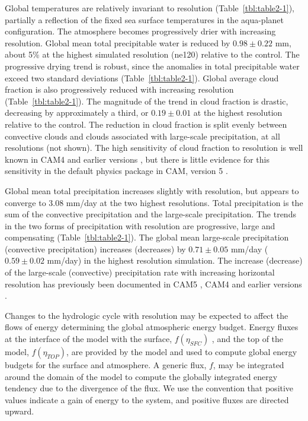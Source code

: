 Global temperatures are relatively invariant to resolution (Table~\ref{tbl:table2-1}), partially a reflection of the fixed sea surface temperatures in the aqua-planet configuration. The atmosphere becomes progressively drier with increasing resolution. Global mean total precipitable water is reduced by $0.98 \pm 0.22$ mm, about 5\% at the highest simulated resolution (ne120) relative to the control. The progressive drying trend is robust, since the anomalies in total precipitable water exceed two standard deviations (Table~\ref{tbl:table2-1}). Global average cloud fraction is also progressively reduced with increasing resolution (Table~\ref{tbl:table2-1}). The magnitude of the trend in cloud fraction is drastic, decreasing by approximately a third, or $0.19 \pm 0.01$ at the highest resolution relative to the control. The reduction in cloud fraction is split evenly between convective clouds and clouds associated with large-scale precipitation, at all resolutions (not shown). The high sensitivity of cloud fraction to resolution is well known in CAM4 \citep{OETAL2013JCLIM,RETAL2013JCLIM,ZetAl2014JCb} and earlier versions \citep{KW1991JGR,W2008TELLUS}, but there is little evidence for this sensitivity in the default physics package in CAM, version 5 \citep[CAM5;][]{ZetAl2014JCb}.

Global mean total precipitation increases slightly with resolution, but appears to converge to 3.08 mm/day at the two highest resolutions. Total precipitation is the sum of the convective precipitation and the large-scale precipitation. The trends in the two forms of precipitation with resolution are progressive, large and compensating (Table~\ref{tbl:table2-1}). The global mean large-scale precipitation (convective precipitation) increases (decreases) by $0.71 \pm 0.05$ mm/day ($0.59 \pm 0.02$ mm/day) in the highest resolution simulation. The increase (decrease) of the large-scale (convective) precipitation rate with increasing horizontal resolution has previously been documented in CAM5 \citep{ZetAl2014JCb}, CAM4 \citep{OETAL2013JCLIM,RETAL2013JCLIM,ZetAl2014JCb} and earlier versions \citep{WETAL1995CD,W2008TELLUS}.

Changes to the hydrologic cycle with resolution may be expected to affect the flows of energy determining the global atmospheric energy budget. Energy fluxes at the interface of the model with the surface, $f(\eta_{SFC})$ , and the top of the model, $f(\eta_{TOP})$, are provided by the model and used to compute global energy budgets for the surface and atmosphere. A generic flux, $f$, may be integrated around the domain of the model to compute the globally integrated energy tendency due to the divergence of the flux. We use the convention that positive values indicate a gain of energy to the system, and positive fluxes are directed upward.

